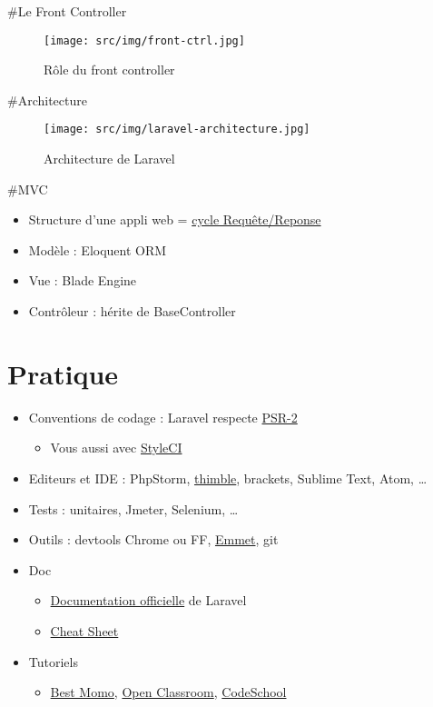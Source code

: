\#Le Front Controller

\begin{figure}
\centering
\texttt{[image: src/img/front-ctrl.jpg]}
\caption{Rôle du front controller}
\end{figure}

\#Architecture

\begin{figure}
\centering
\texttt{[image: src/img/laravel-architecture.jpg]}
\caption{Architecture de Laravel}
\end{figure}

\#MVC

\begin{itemize}
\tightlist
\item
  Structure d'une appli web =
  \href{https://laravel.com/docs/master/lifecycle}{cycle
  Requête/Reponse}
\item
  Modèle : Eloquent ORM
\item
  Vue : Blade Engine
\item
  Contrôleur : hérite de BaseController
\end{itemize}

\hypertarget{pratique}{%
\section{Pratique}\label{pratique}}

\begin{itemize}
\tightlist
\item
  Conventions de codage : Laravel respecte
  \href{https://laravel.com/docs/5.1/contributions\#coding-style}{PSR-2}

  \begin{itemize}
  \tightlist
  \item
    Vous aussi avec \href{https://styleci.io/}{StyleCI}
  \end{itemize}
\item
  Editeurs et IDE : PhpStorm,
  \href{https://thimble.mozilla.org/fr/}{thimble}, brackets, Sublime
  Text, Atom, \ldots{}
\item
  Tests : unitaires, Jmeter, Selenium, \ldots{}
\item
  Outils : devtools Chrome ou FF, \href{http://emmet.io/}{Emmet}, git
\item
  Doc

  \begin{itemize}
  \tightlist
  \item
    \href{https://laravel.com/docs/master}{Documentation officielle} de
    Laravel
  \item
    \href{http://cheats.jesse-obrien.ca/}{Cheat Sheet}
  \end{itemize}
\item
  Tutoriels

  \begin{itemize}
  \tightlist
  \item
    \href{http://laravel.sillo.org/laravel-5/}{Best Momo},
    \href{https://openclassrooms.com/courses/decouvrez-le-framework-php-laravel-1}{Open
    Classroom},
    \href{https://www.codeschool.com/courses/try-laravel}{CodeSchool}
  \end{itemize}
\end{itemize}

